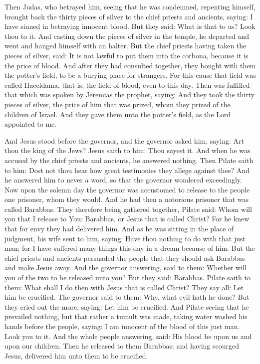 \begin{multicols}{2}
Then Judas, who betrayed him, seeing that he was condemned, repenting himself,
brought back the thirty pieces of silver to the chief priests and ancients,
saying: I have sinned in betraying innocent blood. But they said: What is that
to us? Look thou to it.  And casting down the pieces of silver in the temple,
he departed and went and hanged himself with an halter.  But the chief priests
having taken the pieces of silver, said: It is not lawful to put them into the
corbona, because it is the price of blood.   And after they
had consulted together, they bought with them the potter's field, to be a
burying place for strangers.  For this cause that field was called Haceldama,
that is, the field of blood, even to this day.  Then was fulfilled that which
was spoken by Jeremias the prophet, saying: And they took the thirty pieces of
silver, the price of him that was prized, whom they prized of the children of
Israel.  And they gave them unto the potter's field, as the Lord appointed to
me.  

And Jesus stood before the governor, and the governor asked him, saying: Art
thou the king of the Jews? Jesus saith to him: Thou sayest it.  And when he was
accused by the chief priests and ancients, he answered nothing.  Then Pilate
saith to him: Dost not thou hear how great testimonies they allege against
thee?  And he answered him to never a word, so that the governor wondered
exceedingly.  Now upon the solemn day the governor was accustomed to release to
the people one prisoner, whom they would.  And he had then a notorious prisoner
that was called Barabbas.  They therefore being gathered together, Pilate said:
Whom will you that I release to You: Barabbas, or Jesus that is called Christ?
For he knew that for envy they had delivered him.  And as he was sitting in the
place of judgment, his wife sent to him, saying: Have thou nothing to do with
that just man; for I have suffered many things this day in a dream because of
him.  But the chief priests and ancients persuaded the people that they should
ask Barabbas and make Jesus away.  And the governor answering, said to them:
Whether will you of the two to be released unto you? But they said: Barabbas.
Pilate saith to them: What shall I do then with Jesus that is called Christ?
They say all: Let him be crucified.  The governor said to them: Why, what evil
hath he done? But they cried out the more, saying: Let him be crucified.  And
Pilate seeing that he prevailed nothing, but that rather a tumult was made,
taking water washed his hands before the people, saying: I am innocent of the
blood of this just man. Look you to it.  And the whole people answering, said:
His blood be upon us and upon our children.  Then he released to them Barabbas:
and having scourged Jesus, delivered him unto them to be crucified.  


\end{multicols}
